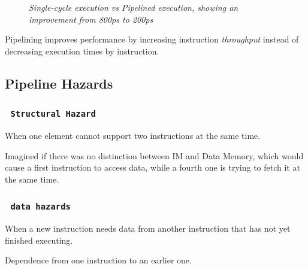 \documentclass[11pt]{article}
\begin{document}
\begin{figure}[htbp]
    \centering
    \caption{\textit{Single-cycle execution vs Pipelined execution, showing an improvement from 800ps to 200ps}}
\end{figure}

Pipelining improves performance by increasing instruction \textit{throughput} instead of decreasing execution times by instruction.

\subsection*{Pipeline Hazards}

\subsubsection*{\rightarrow \ \texttt{Structural Hazard}}
\vspace{-0.5em}

When one element cannot support two instructions at the same time.

Imagined if there was no distinction between IM and Data Memory, which would cause a first instruction to access data, while a fourth one is trying to fetch it at the same time.

\subsubsection*{\rightarrow \ \texttt{data hazards}}
\vspace{-0.5em}

When a new instruction needs data from another instruction that has not yet finished executing.

Dependence from one instruction to an earlier one.
\end{document}
